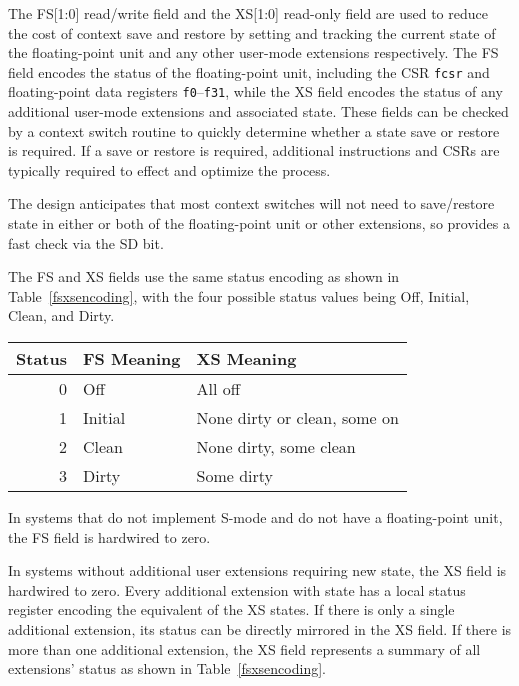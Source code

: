 The FS[1:0] read/write field and the XS[1:0] read-only field are used
to reduce the cost of context save and restore by setting and tracking
the current state of the floating-point unit and any other user-mode
extensions respectively.  The FS field encodes the status of the
floating-point unit, including the CSR {\tt fcsr} and floating-point
data registers {\tt f0}--{\tt f31}, while the XS field encodes the
status of any additional user-mode extensions and associated state.
These fields can be checked by a context switch routine to quickly
determine whether a state save or restore is required.  If a save or
restore is required, additional instructions and CSRs are typically
required to effect and optimize the process.

\begin{commentary}
  The design anticipates that most context switches will not need to
  save/restore state in either or both of the floating-point unit or
  other extensions, so provides a fast check via the SD bit.
\end{commentary}

The FS and XS fields use the same status encoding as shown in
Table~\ref{fsxsencoding}, with the four possible status values being
Off, Initial, Clean, and Dirty.

\begin{table*}[h!]
\begin{center}
\begin{tabular}{|r|l|l|}
\hline
Status  & FS Meaning & XS Meaning\\
\hline	 
0 & Off     &  All off \\
1 & Initial &  None dirty or clean, some on\\
2 & Clean   &  None dirty, some clean \\
3 & Dirty   &  Some dirty \\
\hline
\end{tabular}
\end{center}
\caption{Encoding of FS[1:0] and XS[1:0] status fields.}
\label{fsxsencoding}
\end{table*}

In systems that do not implement S-mode and do not have a
floating-point unit, the FS field is hardwired to zero.

In systems without additional user extensions requiring new state, the
XS field is hardwired to zero.  Every additional extension with state
has a local status register encoding the equivalent of the XS states.
If there is only a single additional extension, its status can be
directly mirrored in the XS field.  If there is more than one
additional extension, the XS field represents a summary of all
extensions' status as shown in Table~\ref{fsxsencoding}.

